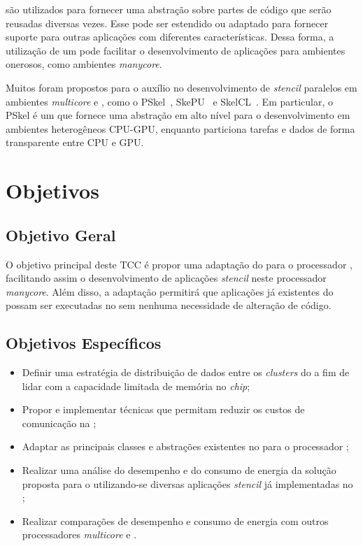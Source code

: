 
\Fws são utilizados para fornecer uma abstração sobre partes de código que serão
reusadas diversas vezes. Esse \fw pode ser estendido ou adaptado para fornecer
suporte para outras aplicações com diferentes características. Dessa forma, a
utilização de um \fw pode facilitar o desenvolvimento de aplicações para
ambientes onerosos, como ambientes \textit{manycore}.

Muitos \fws foram propostos para o auxílio no desenvolvimento de
\textit{stencil} paralelos em ambientes \textit{multicore} e \gpu, como o
PSkel~\cite{pereira15}, SkePU~\cite{enmyren10} e SkelCL~\cite{steuwer11}. Em
particular, o PSkel é um \fw que fornece uma abstração em alto nível para o
desenvolvimento em ambientes heterogêneos CPU-GPU, enquanto particiona tarefas e
dados de forma transparente entre CPU e GPU.

\section{Objetivos}
\subsection{Objetivo Geral}

O objetivo principal deste TCC é propor uma adaptação do \fw \pskel para o processador \mppa,
facilitando assim o desenvolvimento de aplicações \textit{stencil} neste processador \textit{manycore}.
Além disso, a adaptação permitirá que aplicações já existentes do \pskel possam ser executadas
no \mppa sem nenhuma necessidade de alteração de código.

\subsection{Objetivos Específicos}

\begin{itemize}
	\item Definir uma estratégia de distribuição de dados entre os \textit{clusters} do \mppa a fim de
	lidar com a capacidade limitada de memória no \textit{chip};
	\item Propor e implementar técnicas que permitam reduzir os custos de comunicação na \noc;
	\item Adaptar as principais classes e abstrações existentes no \pskel para o processador \mppa;
	\item Realizar uma análise do desempenho e do consumo de energia da solução proposta para o \mppa
	utilizando-se diversas aplicações \textit{stencil} já implementadas no \pskel;
	\item Realizar comparações de desempenho e consumo de energia com outros processadores \textit{multicore}
	e \gpus.
\end{itemize}

